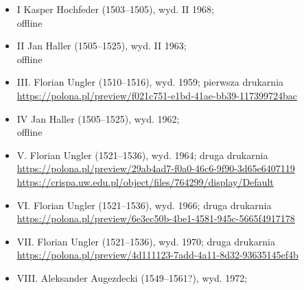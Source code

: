 \documentclass[12pt]{article}
\begin{document}
        \begin{itemize}
        \item I Kasper Hochfeder (1503–1505), wyd. II 1968;\\offline
        \item II Jan Haller (1505–1525), wyd. II 1963;\\offline
      \item III. Florian Ungler (1510–1516), wyd. 1959; pierwsza drukarnia\\
        {\url{https://polona.pl/preview/f021c751-e1bd-41ae-bb39-117399724bac}}
\item IV Jan Haller (1505–1525), wyd. 1962;\\offline
      \item V. Florian Ungler (1521–1536), wyd. 1964; druga drukarnia\\
          \url{https://polona.pl/preview/29ab4ad7-f0a0-46c6-9f90-3d65e6407119}\\
        \url{https://crispa.uw.edu.pl/object/files/764299/display/Default}
      \item VI. Florian Ungler (1521–1536), wyd. 1966; druga drukarnia\\
        {\url{https://polona.pl/preview/6e3ec50b-4be1-4581-945c-5665f4917178}}
      \item VII. Florian Ungler (1521–1536), wyd. 1970; druga drukarnia\\
        {\url{https://polona.pl/preview/4d111123-7add-4a11-8d32-93635145ef4b}}
      \item VIII. Aleksander Augezdecki (1549–1561?), wyd. 1972;\\

\end{itemize}
\end{document}

